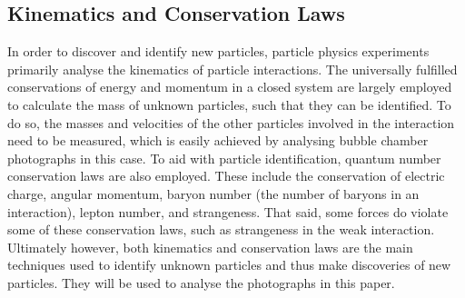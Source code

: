 \documentclass[twocolumn]{article}
\begin{document}
\subsection{Kinematics and Conservation Laws}
In order to discover and identify new particles, particle physics experiments primarily analyse the kinematics of particle interactions. The universally fulfilled conservations of energy and momentum in a closed system are largely employed to calculate the mass of unknown particles, such that they can be identified. To do so, the masses and velocities of the other particles involved in the interaction need to be measured, which is easily achieved by analysing bubble chamber photographs in this case. To aid with particle identification, quantum number conservation laws are also employed. These include the conservation of electric charge, angular momentum, baryon number (the number of baryons in an interaction), lepton number, and strangeness. That said, some forces do violate some of these conservation laws, such as strangeness in the weak interaction. Ultimately however, both kinematics and conservation laws are the main techniques used to identify unknown particles and thus make discoveries of new particles. They will be used to analyse the photographs in this paper.
\end{document}
